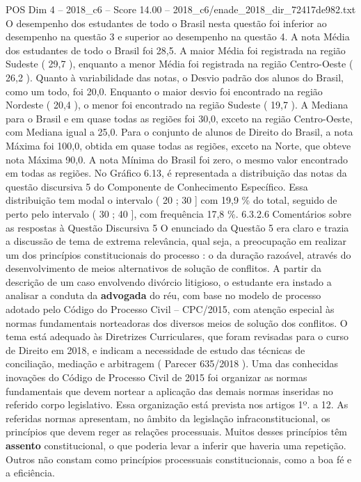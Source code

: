 \begin{textsample}{POS Dim 4 – 2018\_c6 – Score 14.00 – 2018\_c6/enade\_2018\_dir\_72417de982.txt}
O desempenho dos estudantes de todo o Brasil nesta questão foi inferior ao desempenho na questão 3 e superior ao desempenho na questão 4.
A nota Média dos estudantes de todo o Brasil foi 28,5.
A maior Média foi registrada na região Sudeste ( 29,7 ), enquanto a menor Média foi registrada na região Centro-Oeste ( 26,2 ).
Quanto à variabilidade das notas, o Desvio padrão dos alunos do Brasil, como um todo, foi 20,0.
Enquanto o maior desvio foi encontrado na região Nordeste ( 20,4 ), o menor foi encontrado na região Sudeste ( 19,7 ).
A Mediana para o Brasil e em quase todas as regiões foi 30,0, exceto na região Centro-Oeste, com Mediana igual a 25,0.
Para o conjunto de alunos de Direito do Brasil, a nota Máxima foi 100,0, obtida em quase todas as regiões, exceto na Norte, que obteve nota Máxima 90,0.
A nota Mínima do Brasil foi zero, o mesmo valor encontrado em todas as regiões.
No Gráfico 6.13, é representada a distribuição das notas da questão discursiva 5 do Componente de Conhecimento Específico.
Essa distribuição tem modal o intervalo ( 20 ; 30 ] com 19,9 \% do total, seguido de perto pelo intervalo ( 30 ; 40 ], com frequência 17,8 \%. 6.3.2.6 Comentários sobre as respostas à Questão Discursiva 5 O enunciado da Questão 5 era claro e trazia a discussão de tema de extrema relevância, qual seja, a preocupação em realizar um dos princípios constitucionais do processo : o da duração razoável, através do desenvolvimento de meios alternativos de solução de conflitos.
A partir da descrição de um caso envolvendo divórcio litigioso, o estudante era instado a analisar a conduta da \textbf{advogada} do réu, com base no modelo de processo adotado pelo Código do Processo Civil – CPC/2015, com atenção especial às normas fundamentais norteadoras dos diversos meios de solução dos conflitos.
O tema está adequado às Diretrizes Curriculares, que foram revisadas para o curso de Direito em 2018, e indicam a necessidade de estudo das técnicas de conciliação, mediação e arbitragem ( Parecer 635/2018 ).
Uma das conhecidas inovações do Código de Processo Civil de 2015 foi organizar as normas fundamentais que devem nortear a aplicação das demais normas inseridas no referido corpo legislativo.
Essa organização está prevista nos artigos 1º. a 12.
As referidas normas apresentam, no âmbito da legislação infraconstitucional, os princípios que devem reger as relações processuais.
Muitos desses princípios têm \textbf{assento} constitucional, o que poderia levar a inferir que haveria uma repetição.
Outros não constam como princípios processuais constitucionais, como a boa fé e a eficiência.

\end{textsample}
